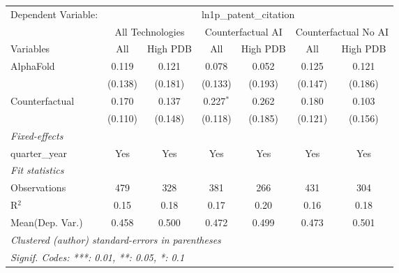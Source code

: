 \begingroup
\centering
\begin{tabular}{lcccccc}
   \tabularnewline \midrule \midrule
   Dependent Variable: & \multicolumn{6}{c}{ln1p\_patent\_citation}\\
 & \multicolumn{2}{c}{All Technologies} & \multicolumn{2}{c}{Counterfactual AI} & \multicolumn{2}{c}{Counterfactual No AI} \\
\cmidrule(lr){1-1}\cmidrule(lr){2-3} \cmidrule(lr){4-5} \cmidrule(lr){6-7}
Variables & \multicolumn{1}{c}{All} & \multicolumn{1}{c}{High PDB} & \multicolumn{1}{c}{All} & \multicolumn{1}{c}{High PDB} & \multicolumn{1}{c}{All} & \multicolumn{1}{c}{High PDB} \\
\cmidrule(lr){1-1}\cmidrule(lr){2-2} \cmidrule(lr){3-3} \cmidrule(lr){4-4} \cmidrule(lr){5-5} \cmidrule(lr){6-6} \cmidrule(lr){7-7}
   AlphaFold      & 0.119   & 0.121   & 0.078       & 0.052   & 0.125   & 0.121\\   
                  & (0.138) & (0.181) & (0.133)     & (0.193) & (0.147) & (0.186)\\   
   Counterfactual & 0.170   & 0.137   & 0.227$^{*}$ & 0.262   & 0.180   & 0.103\\   
                  & (0.110) & (0.148) & (0.118)     & (0.185) & (0.121) & (0.156)\\   
   \midrule
   \emph{Fixed-effects}\\
   quarter\_year  & Yes     & Yes     & Yes         & Yes     & Yes     & Yes\\  
   \midrule
   \emph{Fit statistics}\\
   Observations   & 479     & 328     & 381         & 266     & 431     & 304\\  
   R$^2$          & 0.15    & 0.18    & 0.17        & 0.20    & 0.16    & 0.18\\  
Mean(Dep. Var.) & 0.458 & 0.500 & 0.472 & 0.499 & 0.473 & 0.501 \\
   \midrule \midrule
   \multicolumn{7}{l}{\emph{Clustered (author) standard-errors in parentheses}}\\
   \multicolumn{7}{l}{\emph{Signif. Codes: ***: 0.01, **: 0.05, *: 0.1}}\\
\end{tabular}
\par\endgroup
